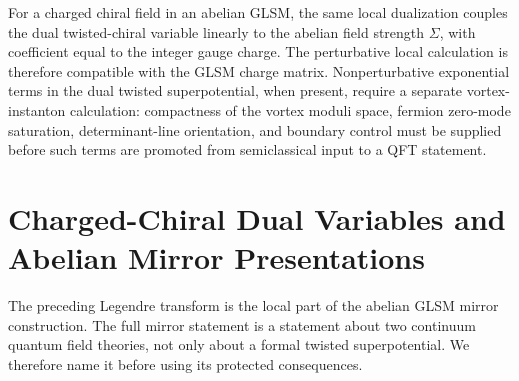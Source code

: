 For a charged chiral field in an abelian GLSM, the same local dualization
couples the dual twisted-chiral variable linearly to the abelian field
strength \(\Sigma\), with coefficient equal to the integer gauge charge.
The perturbative local calculation is therefore compatible with the GLSM charge
matrix.  Nonperturbative exponential terms in the dual twisted
superpotential, when present, require a separate vortex-instanton
calculation: compactness of the vortex moduli space, fermion zero-mode
saturation, determinant-line orientation, and boundary control must be
supplied before such terms are promoted from semiclassical input to a QFT
statement.

\section{Charged-Chiral Dual Variables and Abelian Mirror Presentations}
\label{sec:charged-chiral-dual-mirror-presentations}

The preceding Legendre transform is the local part of the abelian GLSM mirror
construction.  The full mirror statement is a statement about two continuum
quantum field theories, not only about a formal twisted superpotential.  We
therefore name it before using its protected consequences.

